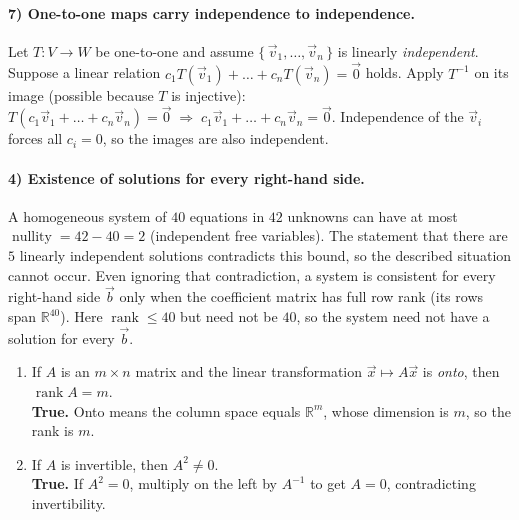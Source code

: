 \documentclass{article}
\begin{document}
\begin{multicols*}{2}
\paragraph{7) One-to-one maps carry independence to independence.}

Let $T:V\to W$ be one-to-one and assume $\{\,\vec v_{1},\dots,\vec v_{n}\,\}$ is linearly \emph{independent}.  
Suppose a linear relation
$
c_{1}T(\vec v_{1})+\dots+c_{n}T(\vec v_{n})=\vec 0
$
holds. Apply $T^{-1}$ on its image (possible because $T$ is injective):
$
T(c_{1}\vec v_{1}+\dots+c_{n}\vec v_{n})=\vec 0 \;\Longrightarrow\;
c_{1}\vec v_{1}+\dots+c_{n}\vec v_{n}=\vec 0.
$
Independence of the $\vec v_{i}$ forces all $c_{i}=0$, so the images are also independent.

\paragraph{4) Existence of solutions for every right-hand side.}

A homogeneous system of $40$ equations in $42$ unknowns can have at most 
$
\operatorname{nullity}=42-40=2
$
(independent free variables).  
The statement that there are $5$ linearly independent solutions contradicts this bound, so the described situation cannot occur.  
Even ignoring that contradiction, a system is consistent for every right-hand side $\vec b$ only when the coefficient matrix has full row rank (its rows span $\mathbb R^{40}$).  
Here $\operatorname{rank}\le 40$ but need not be $40$, so the system need not have a solution for every $\vec b$.

\begin{enumerate}[label=(\alph*)]

    \item If $A$ is an $m\times n$ matrix and the linear transformation $\vec x\mapsto A\vec x$ is \emph{onto}, then $\operatorname{rank}A=m$.\\
    \textbf{True.}  Onto means the column space equals $\mathbb R^{m}$, whose dimension is $m$, so the rank is $m$.
    
    \item If $A$ is invertible, then $A^{2}\ne 0$.\\
    \textbf{True.}  If $A^{2}=0$, multiply on the left by $A^{-1}$ to get $A=0$, contradicting invertibility.
    

\end{enumerate}
\end{multicols*}
\end{document}
